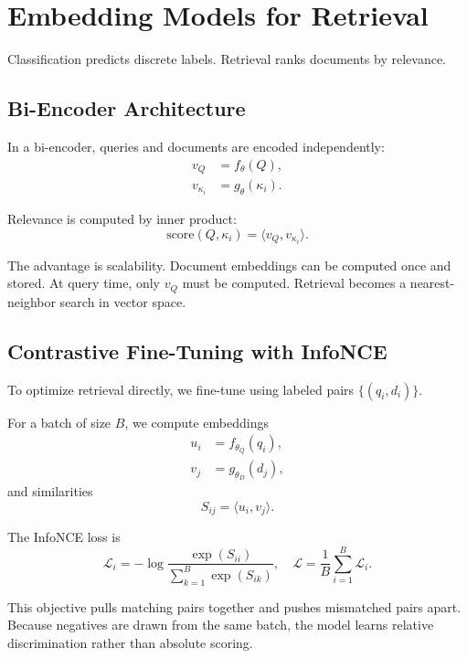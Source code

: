 \section{Embedding Models for Retrieval}
\medskip

Classification predicts discrete labels. Retrieval ranks documents by relevance.

\bigskip
\subsection{Bi-Encoder Architecture}
\medskip

In a bi-encoder, queries and documents are encoded independently:
\begin{align*}
v_Q &= f_\theta(Q), \\
v_{\kappa_i} &= g_\theta(\kappa_i).
\end{align*}

Relevance is computed by inner product:
\[
\text{score}(Q, \kappa_i)
=
\langle v_Q, v_{\kappa_i} \rangle.
\]

The advantage is scalability. Document embeddings can be computed once and stored. At query time, only $v_Q$ must be computed. Retrieval becomes a nearest-neighbor search in vector space.

\bigskip
\subsection{Contrastive Fine-Tuning with InfoNCE}
\medskip

To optimize retrieval directly, we fine-tune using labeled pairs $\{(q_i, d_i)\}$.

For a batch of size $B$, we compute embeddings
\begin{align*}
u_i &= f_{\theta_Q}(q_i), \\
v_j &= g_{\theta_D}(d_j),
\end{align*}
and similarities
\[
S_{ij} = \langle u_i, v_j \rangle.
\]

The InfoNCE loss is
\[
\mathcal{L}_i
=
- \log
\frac{\exp(S_{ii})}
{\sum_{k=1}^{B} \exp(S_{ik})},
\quad
\mathcal{L}
=
\frac{1}{B}
\sum_{i=1}^B \mathcal{L}_i.
\]

This objective pulls matching pairs together and pushes mismatched pairs apart. Because negatives are drawn from the same batch, the model learns relative discrimination rather than absolute scoring.

\bigskip

